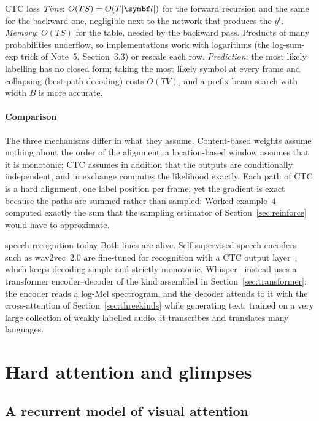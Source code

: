 \documentclass[11pt]{article}
\begin{document}
\begin{runtime}{CTC loss}
\emph{Time}: $O(TS) = O(T|\vect{l}|)$ for the forward recursion and the same for the backward one, negligible next to the
network that produces the $y^t$. \emph{Memory}: $O(TS)$ for the table, needed by the backward pass. Products of many
probabilities underflow, so implementations work with logarithms (the log-sum-exp trick of Note~5, Section~3.3) or rescale
each row. \emph{Prediction}: the most likely labelling has no closed form; taking the most likely symbol at every frame and
collapsing (best-path decoding) costs $O(TV)$, and a prefix beam search with width $B$ is more accurate.
\end{runtime}

\paragraph{Comparison} The three mechanisms differ in what they assume. Content-based weights assume nothing about the
order of the alignment; a location-based window assumes that it is monotonic; CTC assumes in addition that the outputs
are conditionally independent, and in exchange computes the likelihood exactly. Each path of CTC is a hard alignment, one
label position per frame, yet the gradient is exact because the paths are summed rather than sampled: Worked example~4
computed exactly the sum that the sampling estimator of Section~\ref{sec:reinforce} would have to approximate.

\begin{modern}{speech recognition today}
Both lines are alive. Self-supervised speech encoders such as wav2vec~2.0 are fine-tuned for recognition with a CTC
output layer~\cite{baevski2020}, which keeps decoding simple and strictly monotonic. Whisper~\cite{radford2023} instead uses
a transformer encoder--decoder of the kind assembled in Section~\ref{sec:transformer}: the encoder reads a log-Mel
spectrogram, and the decoder attends to it with the cross-attention of Section~\ref{sec:threekinds} while generating text;
trained on a very large collection of weakly labelled audio, it transcribes and translates many languages.
\end{modern}

\section{Hard attention and glimpses}\label{sec:hard}

\subsection{A recurrent model of visual attention}\label{sec:ram}
\end{document}
